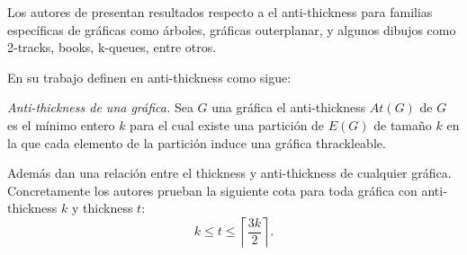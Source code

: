 %
%

%
Los autores de \cite{Dujmovic2017} presentan resultados respecto a el
anti-thickness para familias específicas de gráficas como árboles, gráficas
outerplanar, y algunos dibujos como 2-tracks, books, k-queues, entre otros.

En su trabajo definen en anti-thickness como sigue:
\begin{definition}{\emph{Anti-thickness de una gráfica.}}
Sea $G$ una gráfica el anti-thickness $At(G)$ de $G$ es el mínimo entero $k$
para el cual existe una partición de $E(G)$ de tamaño $k$
en la que cada elemento de la partición induce una gráfica thrackleable.
\end{definition}

Además dan una relación entre el thickness y anti-thickness de cualquier
gráfica. Concretamente los autores prueban la siguiente cota para toda gráfica
con anti-thickness $k$ y thickness $t$:
\[ k \leq t \leq \left\lceil \frac{3k}{2}\right\rceil .\]

